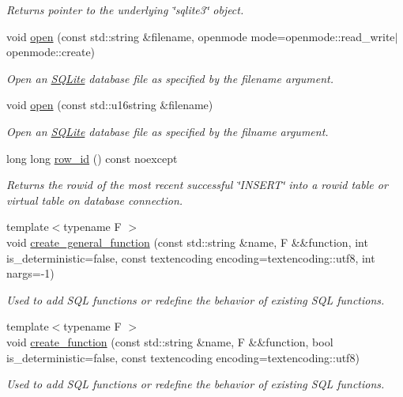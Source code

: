 \begin{DoxyCompactItemize}
\begin{DoxyCompactList}\small\item\em Returns pointer to the underlying \char`\"{}sqlite3\char`\"{} object. \end{DoxyCompactList}\item 
void \hyperlink{a00004_a84da73c4ff1b162624da3e252c2a86c8}{open} (const std\-::string \&filename, openmode mode=openmode\-::read\-\_\-write$\vert$openmode\-::create)
\begin{DoxyCompactList}\small\item\em Open an \hyperlink{a00038}{S\-Q\-Lite} database file as specified by the filename argument. \end{DoxyCompactList}\item 
void \hyperlink{a00004_ac31065d17d9cbe1e1b3021bf11ff0229}{open} (const std\-::u16string \&filename)
\begin{DoxyCompactList}\small\item\em Open an \hyperlink{a00038}{S\-Q\-Lite} database file as specified by the filname argument. \end{DoxyCompactList}\item 
long long \hyperlink{a00004_add860c9b2c630bcfc178e3a7e878ea1b}{row\-\_\-id} () const noexcept
\begin{DoxyCompactList}\small\item\em Returns the rowid of the most recent successful \char`\"{}\-I\-N\-S\-E\-R\-T\char`\"{} into a rowid table or virtual table on database connection. \end{DoxyCompactList}\item 
{\footnotesize template$<$typename F $>$ }\\void \hyperlink{a00004_a3cc15c8f2784e6b706a5992c8014c2dd}{create\-\_\-general\-\_\-function} (const std\-::string \&name, F \&\&function, int is\-\_\-deterministic=false, const textencoding encoding=textencoding\-::utf8, int nargs=-\/1)
\begin{DoxyCompactList}\small\item\em Used to add S\-Q\-L functions or redefine the behavior of existing S\-Q\-L functions. \end{DoxyCompactList}\item 
{\footnotesize template$<$typename F $>$ }\\void \hyperlink{a00004_ad42c081096ec64f35710aa021f2f4b56}{create\-\_\-function} (const std\-::string \&name, F \&\&function, bool is\-\_\-deterministic=false, const textencoding encoding=textencoding\-::utf8)
\begin{DoxyCompactList}\small\item\em Used to add S\-Q\-L functions or redefine the behavior of existing S\-Q\-L functions. \end{DoxyCompactList}\item 

\end{DoxyCompactItemize}
